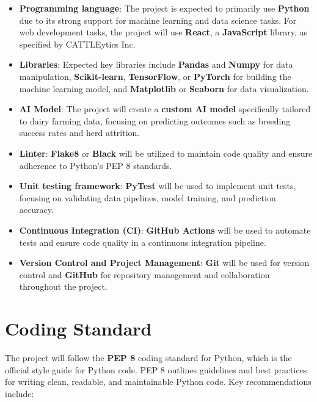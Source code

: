\documentclass{article}
\begin{document}
\begin{itemize}
    \item \textbf{Programming language}: The project is expected to primarily
    use \textbf{Python} due to its strong support for machine learning and data
    science tasks. For web development tasks, the project will use
    \textbf{React}, a \textbf{JavaScript} library, as specified by CATTLEytics
    Inc. 
    \item \textbf{Libraries}: Expected key libraries include \textbf{Pandas} and
    \textbf{Numpy} for data manipulation, \textbf{Scikit-learn},
    \textbf{TensorFlow}, or \textbf{PyTorch} for building the machine learning
    model, and \textbf{Matplotlib} or \textbf{Seaborn} for data visualization.
    \item \textbf{AI Model}: The project will create a \textbf{custom AI model}
    specifically tailored to dairy farming data, focusing on predicting outcomes
    such as breeding success rates and herd attrition.
    \item \textbf{Linter}: \textbf{Flake8} or \textbf{Black} will be utilized to
    maintain code quality and ensure adherence to Python's PEP 8 standards.
    \item \textbf{Unit testing framework}: \textbf{PyTest} will be used to
    implement unit tests, focusing on validating data pipelines, model training,
    and prediction accuracy.
    \item \textbf{Continuous Integration (CI)}: \textbf{GitHub Actions} will be
    used to automate tests and ensure code quality in a continuous integration
    pipeline.
    \item \textbf{Version Control and Project Management}: \textbf{Git} will be
    used for version control and \textbf{GitHub} for repository management and
    collaboration throughout the project.
\end{itemize}

\section{Coding Standard}

The project will follow the \textbf{PEP 8} coding standard for Python, which is
the official style guide for Python code. PEP 8 outlines guidelines and best
practices for writing clean, readable, and maintainable Python code. Key
recommendations include:
\end{document}
